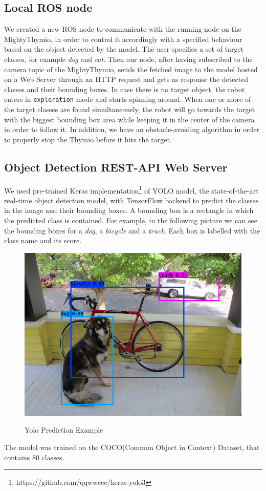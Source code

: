 \documentclass[letterpaper, 10 pt, conference]{ieeeconf}  %
\begin{document}
\subsection*{Local ROS node}
We created a new ROS node to communicate with the running node on the MightyThymio, in order to control it accordingly with a specified behaviour based on the object detected by the model. The user specifies a set of target classes, for example \emph{dog} and \emph{cat}. Then our node, after having subscribed to the camera topic of the MightyThymio, sends the fetched image to the model hosted on a Web  Server through an HTTP request and gets as response the detected classes and their bounding boxes. In case there is no target object, the robot enters in \texttt{exploration} mode and starts spinning around. When one or more of the target classes are found simultaneously, the robot will go towards the target with the biggest bounding box area while keeping it in the center of the camera in order to follow it. In addition, we have an obstacle-avoiding algorithm in order to properly stop the Thymio before it hits the target.

\subsection*{Object Detection REST-API Web Server}
We used pre-trained Keras implementation\footnote{https://github.com/qqwweee/keras-yolo3} of YOLO\cite{DBLP:conf/cvpr/RedmonDGF16} model, the state-of-the-art real-time object detection model, with TensorFlow\cite{tensorflow2015-whitepaper} backend to predict the classes in the image and their bounding boxes. A bounding box is a rectangle in which the predicted class is contained. For example, in the following picture we can see the bounding boxes for a \emph{dog}, a \emph{bicycle} and a \emph{truck}. Each box is labelled with the class name and its score.
\begin{figure}[H]
\centering
\includegraphics[width=\linewidth]{images/yolo-example}
\label{fig: yolo-example}
\caption{Yolo Prediction Example}
\end{figure}
The model was trained on the COCO(Common Object in Context)\cite{COCO} Dataset, that contains 80 classes. 
\end{document}
